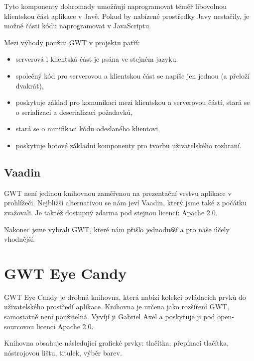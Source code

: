 Tyto komponenty dohromady umožňují naprogramovat téměř libovolnou klientskou část aplikace v Javě.
Pokud by nabízené prostředky Javy nestačily, je možné části kódu naprogramovat v JavaScriptu.

Mezi výhody použiti GWT v projektu patří:
\begin{itemize}
    \item serverová i klientská část je psána ve stejném jazyku.
    \item společný kód pro serverovou a klientskou část se napíše jen jednou (a přeloží dvakrát),
    \item poskytuje základ pro komunikaci mezi klientskou a serverovou částí, stará se o serializaci a deserializaci požadavků,
    \item stará se o minifikaci kódu odeslaného klientovi,
    \item poskytuje hotové základní komponenty pro tvorbu uživatelského rozhraní.
\end{itemize}

\subsection{Vaadin}
GWT není jedinou knihovnou zaměřenou na prezentační vrstvu aplikace v prohlížeči.
Nejbližší alternativou se nám jeví Vaadin\cite{Vaadin}, který jsme také z počátku zvažovali.
Je taktéž dostupný zdarma pod stejnou licencí: Apache 2.0\cite{apache20}.

Nakonec jsme vybrali GWT, které nám přišlo jednodušší a pro naše účely vhodnější.

\section{GWT Eye Candy}
GWT Eye Candy je drobná knihovna, která nabízí kolekci ovládacích prvků do uživatelského prostředí aplikace.
Knihovna je určena jako rozšíření GWT, samostatně není použitelná.
Vyvíjí ji Gabriel Axel a poskytuje ji pod open-sourcovou licencí Apache 2.0\cite{apache20}.

Knihovna obsahuje následující grafické prvky: tlačítka, přepínací tlačítka, nástrojovou lištu, titulek, výběr barev.

